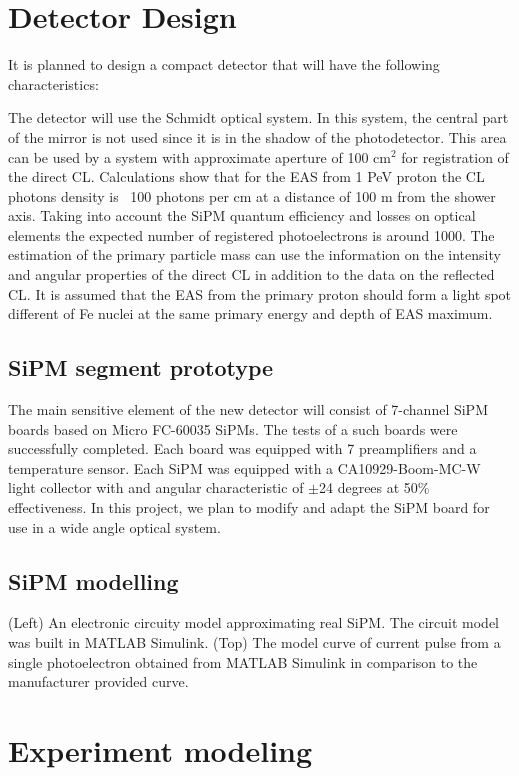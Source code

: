 \documentclass[a4paper]{jpconf}
\begin{document}
\section{Detector Design}
It is planned to design a compact detector that will have the following characteristics:

The detector will use the Schmidt optical system. In this system, the central part of the mirror is not used since it is in the shadow of the photodetector. This area can be used by a system with approximate aperture of 100 cm$^2$ for registration of the direct CL. Calculations show that for the EAS from 1 PeV proton the CL photons density is ~100 photons per cm at a distance of 100 m from the shower axis. Taking into account the SiPM quantum efficiency and losses on optical elements the expected number of registered photoelectrons is around 1000. The estimation of the primary particle mass can use the information on the intensity and angular properties of the direct CL in addition to the data on the reflected CL. It is assumed that the EAS from the primary proton should form a light spot different of Fe nuclei at the same primary energy and depth of EAS maximum.

\subsection{SiPM segment prototype }
The main sensitive element of the new detector will consist of 7-channel SiPM boards based on Micro FC-60035 SiPMs. The tests of a such boards were successfully completed. Each board was equipped with 7 preamplifiers and a temperature sensor. Each SiPM was equipped with a CA10929-Boom-MC-W light collector with and angular characteristic of $\pm$24 degrees at 50\% effectiveness. In this project, we plan to modify and adapt the SiPM board for use in a wide angle optical system.

\subsection{SiPM modelling}
(Left) An electronic circuity model approximating real SiPM. The circuit model was built in MATLAB Simulink. (Top) The model curve of current pulse from a single photoelectron obtained from MATLAB Simulink in comparison to the manufacturer provided curve.

\section{Experiment modeling}
\end{document}
